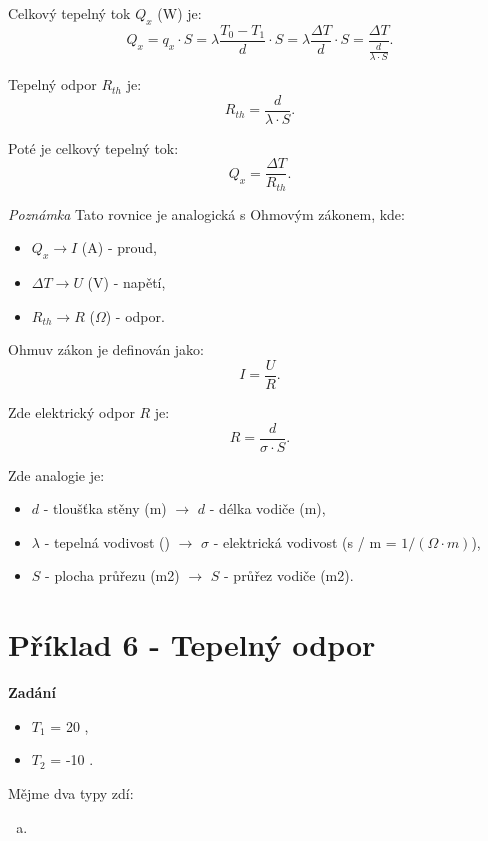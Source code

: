 \documentclass{article}
\begin{document}
Celkový tepelný tok $Q_x$ (W) je:
$$
    Q_x = q_x \cdot S = \lambda \frac{T_0 - T_1}{d} \cdot S = \lambda \frac{\Delta T}{d} \cdot S = \frac{\Delta T}{\frac{d}{\lambda \cdot S}}.
$$

Tepelný odpor $R_{th}$ je:
$$
    R_{th} = \frac{d}{\lambda \cdot S}.
$$

Poté je celkový tepelný tok:
$$
    Q_x = \frac{\Delta T}{R_{th}}.
$$

\textit{Poznámka}
Tato rovnice je analogická s Ohmovým zákonem, kde:
\begin{itemize}
    \item $Q_x \rightarrow I$ (A) - proud,
    \item $\Delta T \rightarrow U$ (V) - napětí,
    \item $R_{th} \rightarrow R$ ($\Omega$) - odpor.
\end{itemize}

Ohmuv zákon je definován jako:
$$
    I = \frac{U}{R}.
$$

Zde elektrický odpor $R$ je:
$$
    R = \frac{d}{\sigma \cdot S}.
$$

Zde analogie je:
\begin{itemize}
    \item $d$ - tloušťka stěny (m) $\rightarrow$ $d$ - délka vodiče (m),
    \item $\lambda$ - tepelná vodivost (\ueqWandMinvsqKinv) $\rightarrow$ $\sigma$ - elektrická vodivost (s / m = $1 / (\Omega \cdot m)$),
    \item $S$ - plocha průřezu (m2) $\rightarrow$ $S$ - průřez vodiče (m2).
\end{itemize}



\section*{Příklad 6 - Tepelný odpor}

\textbf{Zadání}

\begin{itemize}
    \item $T_1$ = 20 \ueqCELS,
    \item $T_2$ = -10 \ueqCELS.
\end{itemize}

Mějme dva typy zdí:
\begin{enumerate}[a)]
    \item
\end{enumerate}
\end{document}

